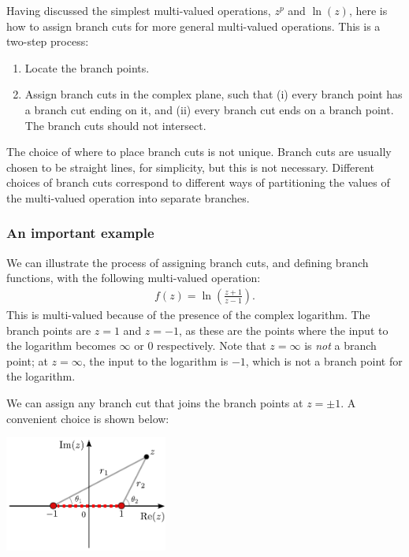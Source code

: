 \documentclass[10pt,a4paper]{article}
\begin{document}
Having discussed the simplest multi-valued operations, $z^p$ and
$\ln(z)$, here is how to assign branch cuts for more general
multi-valued operations. This is a two-step process:

\begin{enumerate}
\item Locate the branch points.

\item Assign branch cuts in the complex plane, such that (i) every
  branch point has a branch cut ending on it, and (ii) every branch
  cut ends on a branch point. The branch cuts should not intersect.
\end{enumerate}

\noindent
The choice of where to place branch cuts is not unique.  Branch cuts
are usually chosen to be straight lines, for simplicity, but this is
not necessary. Different choices of branch cuts correspond to
different ways of partitioning the values of the multi-valued
operation into separate branches.

\subsubsection{An important example}
\label{an-important-example}

We can illustrate the process of assigning branch cuts, and defining
branch functions, with the following multi-valued operation:
\begin{align}
  f(z) = \ln\left(\frac{z+1}{z-1}\right).
\end{align}
This is multi-valued because of the presence of the complex
logarithm. The branch points are $z = 1$ and $z = -1$, as these are
the points where the input to the logarithm becomes $\infty$ or $0$
respectively. Note that $z = \infty$ is \textit{not} a branch point;
at $z = \infty$, the input to the logarithm is $-1$, which is not a
branch point for the logarithm.

We can assign any branch cut that joins the branch points at $z = \pm
1$.  A convenient choice is shown below:

\begin{center}
  \includegraphics[width=0.4\textwidth]{branch_cut_example}
\end{center}
\end{document}
